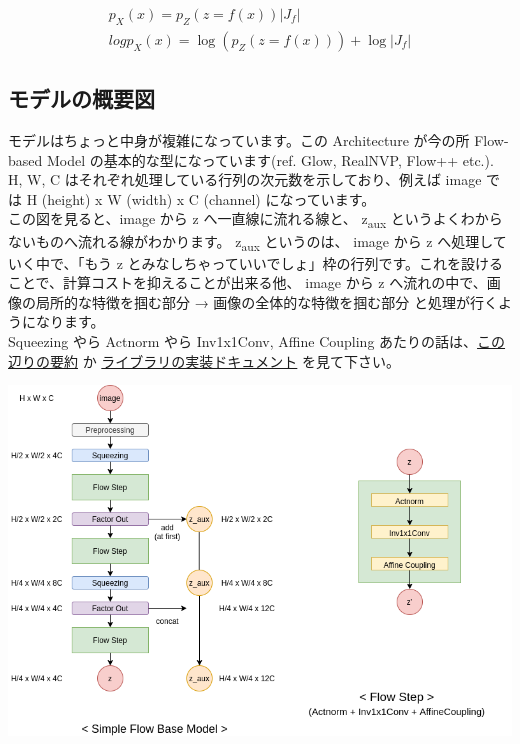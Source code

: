 \documentclass[dvipdfmx]{article}
\begin{document}
\begin{eqnarray}
p_X(x) = p_Z(z = f(x))|J_f|\\
log p_X(x) = \log(p_Z(z = f(x))) + \log |J_f|
\end{eqnarray}

\subsection{モデルの概要図}
\label{sec:org1578a39}
モデルはちょっと中身が複雑になっています。この Architecture が今の所 Flow-based Model の基本的な型になっています(ref. Glow, RealNVP, Flow++ etc.).\\
H, W, C はそれぞれ処理している行列の次元数を示しており、例えば image では H (height) x W (width) x C (channel) になっています。\\

この図を見ると、image から z へ一直線に流れる線と、 z\textsubscript{aux} というよくわからないものへ流れる線がわかります。 z\textsubscript{aux} というのは、 image から z へ処理していく中で、「もう  z とみなしちゃっていいでしょ」枠の行列です。これを設けることで、計算コストを抑えることが出来る他、 image から z へ流れの中で、画像の局所的な特徴を掴む部分 → 画像の全体的な特徴を掴む部分 と処理が行くようになります。\\

Squeezing やら Actnorm やら Inv1x1Conv, Affine Coupling あたりの話は、\href{https://qiita.com/exp/items/4f562ec788f2ac5241dc}{この辺りの要約} か \href{https://mokkemeguru.github.io/TFGENZOO/TFGENZOO.html}{ライブラリの実装ドキュメント} を見て下さい。\\
\begin{center}
\includegraphics[width=\linewidth]{./simple_flow_image.png}
\end{center}
\end{document}

